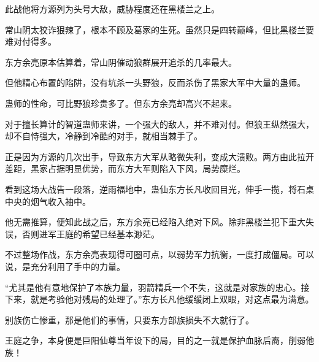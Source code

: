 \begin{this_body}
此战他将方源列为头号大敌，威胁程度还在黑楼兰之上。

常山阴太狡诈狠辣了，根本不顾及葛家的生死。虽然只是四转巅峰，但比黑楼兰要难对付得多。

东方余亮原本估算着，常山阴催动狼群展开追杀的几率最大。

但他精心布置的陷阱，没有坑杀一头野狼，反而杀伤了黑家大军中大量的蛊师。

蛊师的性命，可比野狼珍贵多了。但东方余亮却高兴不起来。

对于擅长算计的智道蛊师来讲，一个强大的敌人，并不难对付。但狼王纵然强大，却不自恃强大，冷静到冷酷的对手，就相当棘手了。

正是因为方源的几次出手，导致东方大军从略微失利，变成大溃败。两方由此拉开差距，黑家占据明显优势，而东方大军则陷入下风，局势糜烂。

看到这场大战告一段落，逆雨福地中，蛊仙东方长凡收回目光，伸手一揽，将石桌中央的烟气收入袖中。

他无需推算，便知此战之后，东方余亮已经陷入绝对下风。除非黑楼兰犯下重大失误，否则进军王庭的希望已经基本渺茫。

不过整场作战，东方余亮表现得可圈可点，以弱势军力抗衡，一度打成僵局。可以说，是充分利用了手中的力量。

“尤其是他有意地保护了本族力量，羽箭精兵一个不失，这就是对家族的忠心。接下来，就是考验他对残局的处理了。”东方长凡他缓缓闭上双眼，对这点最为满意。

别族伤亡惨重，那是他们的事情，只要东方部族损失不大就行了。

王庭之争，本身便是巨阳仙尊当年设下的局，目的之一就是保护血脉后裔，削弱他族！

\end{this_body}

